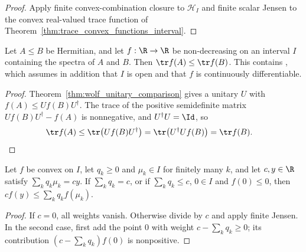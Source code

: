 \begin{proof}\leanok
    Apply finite convex-combination closure to $\mathcal H_I$ and finite
    scalar Jensen to the convex real-valued trace function of
    Theorem~\ref{thm:trace_convex_functions_interval}.
\end{proof}

\begin{theorem}%
    \label{thm:monotone_trace_functions}
    \leanok
    Let $A\le B$ be Hermitian, and let $f:\R\to\R$ be non-decreasing on an
    interval $I$ containing the spectra of $A$ and $B$. Then
    $\tr f(A)\le\tr f(B)$. This contains
    \cite[Proposition~5.2, Equation~(5.55)]{Wolf2012Quantum}, which assumes in
    addition that $I$ is open and that $f$ is continuously differentiable.
\end{theorem}

\begin{proof}\leanok
    Theorem~\ref{thm:wolf_unitary_comparison} gives a unitary $U$ with
    $f(A)\le Uf(B)U^\dagger$. The trace of the positive semidefinite matrix
    $Uf(B)U^\dagger-f(A)$ is nonnegative, and $U^\dagger U=\Id$, so
    \begin{align}
        \tr f(A)&\le\tr\bigl(Uf(B)U^\dagger\bigr)
            =\tr\bigl(U^\dagger Uf(B)\bigr)=\tr f(B).
        \notag
    \end{align}
\end{proof}

\begin{lemma}%
    \label{lem:unnormalized_jensen}
    \leanok
    Let $f$ be convex on $I$, let $q_k\ge0$ and $\mu_k\in I$ for finitely many
    $k$, and let $c,y\in\R$ satisfy $\sum_kq_k\mu_k=cy$. If $\sum_kq_k=c$,
    or if $\sum_kq_k\le c$, $0\in I$ and $f(0)\le0$, then
    $cf(y)\le\sum_kq_kf(\mu_k)$.
\end{lemma}

\begin{proof}\leanok
    If $c=0$, all weights vanish. Otherwise divide by $c$ and apply finite
    Jensen. In the second case, first add the point $0$ with weight
    $c-\sum_kq_k\ge0$; its contribution $(c-\sum_kq_k)f(0)$ is nonpositive.
\end{proof}

